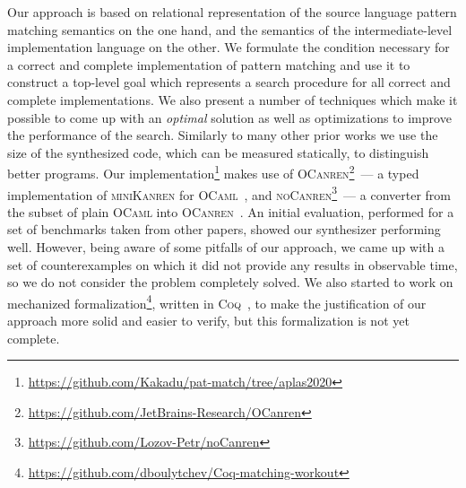 Our approach is based on relational representation of the source language pattern matching semantics on the one hand, and
the semantics of the intermediate-level implementation language on the other. We formulate the condition necessary for a correct and complete implementation of pattern matching and use it to
construct a top-level goal which represents a search procedure for all correct and complete implementations. We also present a number of techniques which make it possible to come up with an
\emph{optimal} solution as well as optimizations to improve the performance of the search. Similarly to many other prior works we use the size of the synthesized code, which can be measured
statically, to distinguish better programs. Our implementation\footnote{\url{https://github.com/Kakadu/pat-match/tree/aplas2020}} makes use of \textsc{OCanren}\footnote{\url{https://github.com/JetBrains-Research/OCanren}}~---
 a typed implementation of \textsc{miniKanren} for \textsc{OCaml}~\cite{OCanren}, and \textsc{noCanren}\footnote{\url{https://github.com/Lozov-Petr/noCanren}}~--- 
a converter from the subset of plain \textsc{OCaml} into \textsc{OCanren}~\cite{conversion}. An initial  evaluation, performed for a set of benchmarks taken from other papers, showed our synthesizer performing well.
However, being aware of some pitfalls of our approach, we came up with a set of counterexamples on which it did not provide any results in observable time, so we do not consider the problem
completely solved. We also started to work on mechanized 
formalization\footnote{\url{https://github.com/dboulytchev/Coq-matching-workout}},
written in \textsc{Coq}~\cite{Coq}, to make the justification of our approach more solid and easier to verify, but this formalization is not yet complete. 

 

\begin{comment}
We apply relational programming techniques to the problem of synthesizing efficient implementation for a pattern matching construct.
Although in principle pattern matching can be implemented in a trivial way, the result suffers from inefficiency in terms of both
performance and code size. Thus, in implementing functional languages alternative, more elaborate  approaches are widely used.
However, as there are multiple kinds and flavors of pattern matching constructs, these approaches have to be specifically developed
and justified for each concrete inhabitant of the pattern matching ``zoo''. We formulate the pattern matching synthesis problem in
declarative terms and apply relational programming, a specific form of constraint logic programming, to develop a 
develop optimizations which improve the efficiency of the synthesis and guarantee the
optimality of the result. 
\end{comment}
